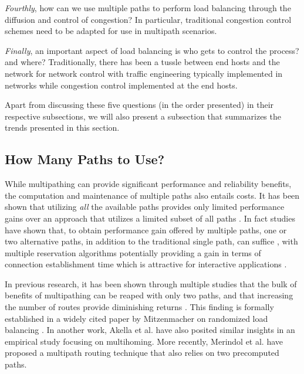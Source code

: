\documentclass[10pt]{IEEEtran}
\begin{document}
\textit{Fourthly}, how can we use multiple paths to perform load balancing through the diffusion and control of congestion? In particular, traditional congestion control schemes need to be adapted for use in multipath scenarios. 

\textit{Finally}, an important aspect of load balancing is who gets to control the process? and where? Traditionally, there has been a tussle between end hosts and the network for network control with traffic engineering typically implemented in networks while congestion control implemented at the end hosts. 

Apart from discussing these five questions (in the order presented) in their respective subsections, we will also present a subsection that summarizes the trends presented in this section. 



\subsection{How Many Paths to Use?}
\label{subsec:how_many}

While multipathing can provide significant performance and reliability benefits, the computation and maintenance of multiple paths also entails costs. It has been shown that utilizing \textit{all} the available paths provides only limited performance gains over an approach that utilizes a limited subset of all paths \cite{wang2011cost}. In fact studies have shown that, to obtain performance gain offered by multiple paths, one or two alternative paths, in addition to the traditional single path, can suffice \cite{wang2011cost}, \cite{cidon1999analysis} with multiple reservation algorithms potentially providing a gain in terms of connection establishment time which is attractive for interactive applications \cite{cidon1999analysis}.

In previous research, it has been shown through multiple studies that the bulk of benefits of multipathing can be reaped with only two paths, and that increasing the number of routes provide diminishing returns \cite{wang2011cost}. This finding is formally established in a widely cited paper by Mitzenmacher on randomized load balancing \cite{mitzenmacher2001power}. In another work, Akella et al. have also posited similar insights in an empirical study \cite{akella2003measurement} focusing on multihoming.  More recently, Merindol et al. have proposed a multipath routing technique that also relies on two precomputed paths.
\end{document}

